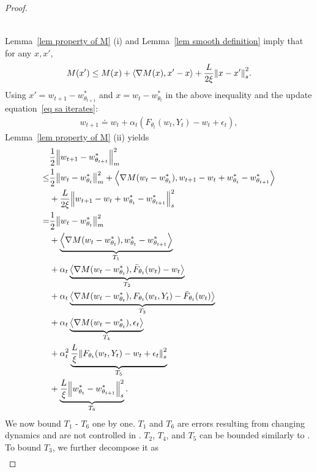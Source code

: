 \documentclass[twoside,11pt]{article}
\newcommand{\indot}[2]{{\left<#1, #2\right>}}
\numberwithin{assucounter}{section}
\begin{document}
\begin{proof}
\begin{lemma}
\begin{enumerate}[(i).]
\begin{align}
        \end{align}
    \end{enumerate}
\end{lemma}
Lemma~\ref{lem property of M} (i) and Lemma~\ref{lem smooth definition} imply that for any $x, x'$,
\begin{align}
    M(x') \leq M(x) + \indot{\nabla M(x)}{x' - x} + \frac{L}{2\xi} \norm{x - x'}_s^2.
\end{align}
Using $x' = w_{t+1} - w^*_{\theta_{t+1}}$ and $x = w_t - w^*_{\theta_t}$ in the above inequality and the update equation~\eqref{eq sa iterates}:
\begin{align}
    w_{t+1} \doteq w_t + \alpha_t (F_{\theta_t}(w_t, Y_t) - w_t + \epsilon_t),
\end{align} Lemma~\ref{lem property of M} (ii) yields
\begin{align}
  \label{eq expansion of M}
  &\frac{1}{2} \norm{w_{t+1} - w^*_{\theta_{t+1}}}_m^2 \\
  \leq& \frac{1}{2}\norm{w_t - w^*_{\theta_t}}_m^2 + \indot{\nabla M(w_t - w^*_{\theta_t})}{w_{t+1} - w_t + w^*_{\theta_t} - w^*_{\theta_{t+1}}} \\
  &+ \frac{L}{2\xi} \norm{w_{t+1} - w_t + w^*_{\theta_t} - w^*_{\theta_{t+1}}}^2_s \\
  =&\frac{1}{2}\norm{w_t - w^*_{\theta_t}}_m^2 \\
  &+ \underbrace{\indot{\nabla M(w_t - w^*_{\theta_t})}{w^*_{\theta_t} - w^*_{\theta_{t+1}}}}_{T_1} \\
  &+ \alpha_t \underbrace{\indot{\nabla M(w_t - w^*_{\theta_t})}{\bar F_{\theta_t}(w_t) - w_t}}_{T_2} \\
  &+ \alpha_t \underbrace{\indot{\nabla M(w_t - w^*_{\theta_t})}{F_{\theta_t}(w_t, Y_t) - \bar F_{\theta_t}(w_t)} }_{T_3} \\
  &+ \alpha_t \underbrace{\indot{\nabla M(w_t - w^*_{\theta_t})}{\epsilon_t} }_{T_4} \\
  &+ \alpha_t^2\underbrace{\frac{L }{\xi}\norm{F_{\theta_t}(w_t, Y_t) - w_t + \epsilon_t}_s^2}_{T_5} \\
  &+ \underbrace{\frac{L}{\xi} \norm{w^*_{\theta_t} - w^*_{\theta_{t+1}}}_s^2}_{T_6}.
\end{align}
We now bound $T_1$ - $T_6$ one by one. 
$T_1$ and $T_6$ are errors resulting from changing dynamics and are not controlled in \citet{chen2021lyapunov}.
$T_2$, $T_4$, and $T_5$ can be bounded similarly to \citet{chen2021lyapunov}.
To bound $T_3$,
we further decompose it as
\begin{align}

\end{align}
\end{proof}
\end{document}
